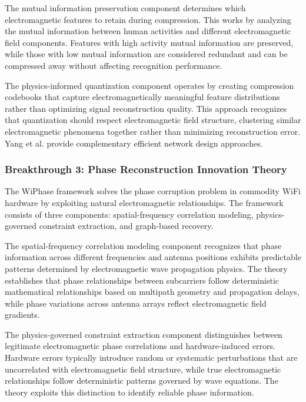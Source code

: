 \documentclass[journal]{IEEEtran}
\begin{document}
The mutual information preservation component determines which electromagnetic features to retain during compression. This works by analyzing the mutual information between human activities and different electromagnetic field components. Features with high activity mutual information are preserved, while those with low mutual information are considered redundant and can be compressed away without affecting recognition performance.

The physics-informed quantization component operates by creating compression codebooks that capture electromagnetically meaningful feature distributions rather than optimizing signal reconstruction quality. This approach recognizes that quantization should respect electromagnetic field structure, clustering similar electromagnetic phenomena together rather than minimizing reconstruction error. Yang et al. \cite{yang2022efficientfi} provide complementary efficient network design approaches.

\subsubsection{Breakthrough 3: Phase Reconstruction Innovation Theory}

The WiPhase framework \cite{chen2024wiphase} solves the phase corruption problem in commodity WiFi hardware by exploiting natural electromagnetic relationships. The framework consists of three components: spatial-frequency correlation modeling, physics-governed constraint extraction, and graph-based recovery.

The spatial-frequency correlation modeling component recognizes that phase information across different frequencies and antenna positions exhibits predictable patterns determined by electromagnetic wave propagation physics. The theory establishes that phase relationships between subcarriers follow deterministic mathematical relationships based on multipath geometry and propagation delays, while phase variations across antenna arrays reflect electromagnetic field gradients.

The physics-governed constraint extraction component distinguishes between legitimate electromagnetic phase correlations and hardware-induced errors. Hardware errors typically introduce random or systematic perturbations that are uncorrelated with electromagnetic field structure, while true electromagnetic relationships follow deterministic patterns governed by wave equations. The theory exploits this distinction to identify reliable phase information.
\end{document}
